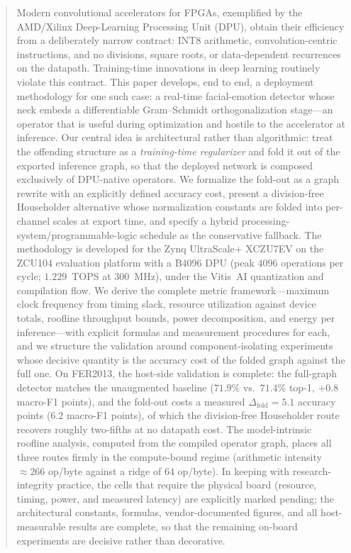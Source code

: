 \documentclass[onecolumn,journal]{IEEEtran}
\begin{document}
\begin{abstract}
Modern convolutional accelerators for FPGAs, exemplified by the AMD/Xilinx Deep-Learning
Processing Unit (DPU), obtain their efficiency from a deliberately narrow contract: INT8
arithmetic, convolution-centric instructions, and no divisions, square roots, or
data-dependent recurrences on the datapath. Training-time innovations in deep learning
routinely violate this contract. This paper develops, end to end, a deployment
methodology for one such case: a real-time facial-emotion detector whose neck embeds a
differentiable Gram--Schmidt orthogonalization stage---an operator that is useful during
optimization and hostile to the accelerator at inference. Our central idea is
architectural rather than algorithmic: treat the offending structure as a
\emph{training-time regularizer} and fold it out of the exported inference graph, so
that the deployed network is composed exclusively of DPU-native operators. We formalize
the fold-out as a graph rewrite with an explicitly defined accuracy cost, present a
division-free Householder alternative whose normalization constants are folded into
per-channel scales at export time, and specify a hybrid processing-system/programmable-logic
schedule as the conservative fallback. The methodology is developed for the Zynq
UltraScale+ XCZU7EV on the ZCU104 evaluation platform with a B4096 DPU
(peak $4096$ operations per cycle; $1.229$~TOPS at $300$~MHz), under the Vitis~AI
quantization and compilation flow. We derive the complete metric framework---maximum
clock frequency from timing slack, resource utilization against device totals, roofline
throughput bounds, power decomposition, and energy per inference---with explicit
formulas and measurement procedures for each, and we structure the validation around
component-isolating experiments whose decisive quantity is the accuracy cost of the
folded graph against the full one. On FER2013, the host-side validation is complete:
the full-graph detector matches the unaugmented baseline
($71.9\%$ vs.\ $71.4\%$ top-1, $+0.8$ macro-F1 points), and the fold-out costs a
measured $\Delta_{\mathrm{fold}}=5.1$ accuracy points ($6.2$ macro-F1 points), of
which the division-free Householder route recovers roughly two-fifths at no
datapath cost. The model-intrinsic roofline analysis, computed from the compiled
operator graph, places all three routes firmly in the compute-bound regime
(arithmetic intensity $\approx\!266$ op/byte against a ridge of $64$ op/byte). In
keeping with research-integrity practice, the cells that require the physical board
(resource, timing, power, and measured latency) are explicitly marked pending; the
architectural constants, formulas, vendor-documented figures, and all host-measurable
results are complete, so that the remaining on-board experiments are decisive rather
than decorative.
\end{abstract}
\end{document}
